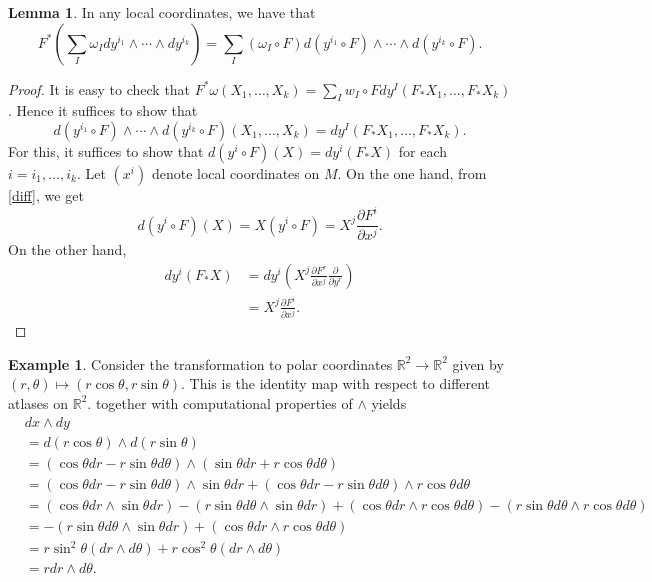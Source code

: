 \documentclass[10pt,letterpaper,cm]{nupset}
\theoremstyle{definition}
\newtheorem{exmp}[definition]{Example}
\theoremstyle{theorem}
\newtheorem{lemma}[definition]{Lemma}
\theoremstyle{remark}
\newcommand{\R}{\mathbb R}
\newcommand{\1}{\mathbf{1}}
\newcommand{\0}{\vec 0}
\begin{document}
\begin{lemma}\label{natpull}
In any local coordinates, we have that $$F^{\ast}\left(\sum_I \omega_I dy^{i_1} \wedge \cdots \wedge dy^{i_k}\right) = \sum_I \left(\omega_I \circ F\right)d\left(y^{i_1} \circ F\right) \wedge \cdots \wedge d\left(y^{i_k} \circ F\right).$$
\end{lemma}
\begin{proof}
It is easy to check that $F^{\ast}{\omega}\left(X_1, \ldots, X_k\right) = \sum_Iw_I\circ Fdy^I\left(F_{\ast}{X_1}, \ldots, F_{\ast}{X_k}\right)$. Hence it suffices to show that 
\[
d\left(y^{i_1} \circ F\right) \wedge \cdots \wedge d\left(y^{i_k} \circ F\right)\left(X_1, \ldots, X_k\right) = dy^I\left(F_{\ast}{X_1}, \ldots, F_{\ast}{X_k}\right).
\] For this, it suffices to show that $d\left(y^i \circ F\right)(X) = dy^i\left(F_{\ast}{X}\right)$ for each $i = i_1, \ldots, i_k$. Let $\left(x^i\right)$ denote local coordinates on $M$. On the one hand, from \cref{diff}, we get
\[
d\left(y^i \circ F\right)(X)  = X\left(y^i \circ F\right)
= X^j\frac{\partial{F^i}}{\partial{x^j}}
. \]
On the other hand,
\begin{align*}
dy^i\left(F_{\ast}{X}\right) & = dy^i\left(X^j\frac{\partial{F^r}}{\partial{x^j}}\frac{\partial}{\partial{y^r}}    \right)
\\ & = X^j\frac{\partial{F^i}}{\partial{x^j}}
.\end{align*}
\end{proof}



\begin{exmp}
Consider the transformation to polar coordinates $\R^2 \to \R^2$ given by $\left(r, \theta\right) \mapsto \left(r\cos \theta, r\sin \theta\right)$. This is the identity map with respect to different atlases on $\R^2$.  together with computational properties of $\wedge$ yields
\begin{align*} & dx \wedge dy \\ & = d(r\cos \theta) \wedge d(r\sin \theta) \\ &=   (\cos \theta dr - r\sin \theta d\theta) \wedge (\sin \theta dr +r \cos \theta d\theta) \\ &= (\cos \theta dr - r\sin \theta d\theta) \wedge \sin \theta dr + (\cos \theta dr - r\sin \theta d\theta) \wedge r \cos \theta d\theta \\ & = (\cos \theta dr \wedge \sin \theta dr) - (r \sin \theta d \theta \wedge \sin \theta dr) +  (\cos \theta dr \wedge r \cos \theta d\theta) - (r\sin \theta d \theta \wedge r \cos \theta d \theta)\\ & =  {-(r \sin \theta d \theta \wedge \sin \theta dr)} +  (\cos \theta dr \wedge r \cos \theta d\theta) \\ & = r\sin^2\theta(dr \wedge d\theta) + r\cos^2 \theta(dr \wedge d\theta)\\ & = rdr \wedge d\theta.
\end{align*}
\end{exmp}
\end{document}

